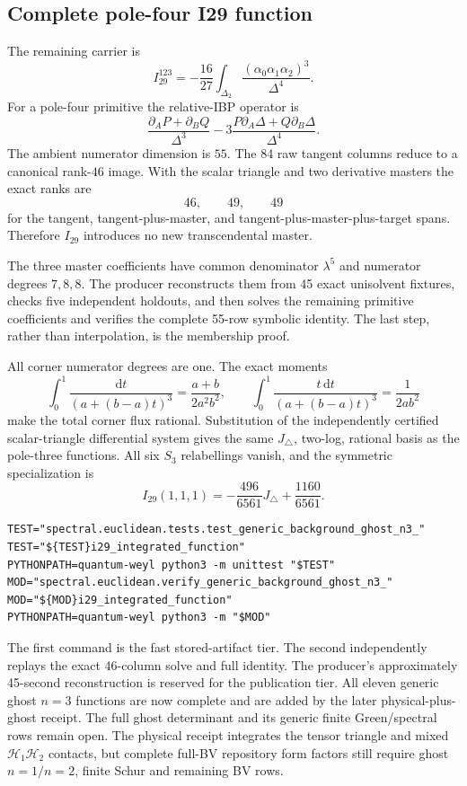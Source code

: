 \documentclass[11pt]{article}
\theoremstyle{definition}
\theoremstyle{remark}
\newcommand{\dd}{\mathrm d}
\begin{document}
\subsection{Complete pole-four I29 function}

The remaining carrier is
\[
 I_{29}^{123}=-\frac{16}{27}\int_{\Delta_2}
 \frac{(\alpha_0\alpha_1\alpha_2)^3}{\Delta^4}.
\]
For a pole-four primitive the relative-IBP operator is
\[
 \frac{\partial_AP+\partial_BQ}{\Delta^3}
 -3\frac{P\partial_A\Delta+Q\partial_B\Delta}{\Delta^4}.
\]
The ambient numerator dimension is $55$.  The 84 raw tangent columns reduce
to a canonical rank-$46$ image.  With the scalar triangle and two derivative
masters the exact ranks are
\[
 46,\qquad 49,\qquad 49
\]
for the tangent, tangent-plus-master, and tangent-plus-master-plus-target
spans.  Therefore $I_{29}$ introduces no new transcendental master.

The three master coefficients have common denominator $\lambda^5$ and
numerator degrees $7,8,8$.  The producer reconstructs them from 45 exact
unisolvent fixtures, checks five independent holdouts, and then solves the
remaining primitive coefficients and verifies the complete 55-row symbolic
identity.  The last step, rather than interpolation, is the membership proof.

All corner numerator degrees are one.  The exact moments
\[
 \int_0^1\frac{\dd t}{(a+(b-a)t)^3}
 =\frac{a+b}{2a^2b^2},\qquad
 \int_0^1\frac{t\,\dd t}{(a+(b-a)t)^3}
 =\frac1{2ab^2}
\]
make the total corner flux rational.  Substitution of the independently
certified scalar-triangle differential system gives the same
$J_\triangle$, two-log, rational basis as the pole-three functions.  All six
$S_3$ relabellings vanish, and the symmetric specialization is
\[
 I_{29}(1,1,1)=-\frac{496}{6561}J_\triangle+\frac{1160}{6561}.
\]

\begin{verbatim}
TEST="spectral.euclidean.tests.test_generic_background_ghost_n3_"
TEST="${TEST}i29_integrated_function"
PYTHONPATH=quantum-weyl python3 -m unittest "$TEST"
MOD="spectral.euclidean.verify_generic_background_ghost_n3_"
MOD="${MOD}i29_integrated_function"
PYTHONPATH=quantum-weyl python3 -m "$MOD"
\end{verbatim}

The first command is the fast stored-artifact tier.  The second independently
replays the exact 46-column solve and full identity.  The producer's
approximately 45-second reconstruction is reserved for the publication tier.
All eleven generic ghost $n=3$ functions are now complete and are added by
the later physical-plus-ghost receipt.  The full ghost determinant and its
generic finite Green/spectral rows remain open.  The physical receipt
integrates the tensor triangle and mixed $\mathcal H_1\mathcal H_2$ contacts,
but complete full-BV repository form factors still require ghost $n=1/n=2$,
finite Schur and remaining BV rows.
\end{document}
